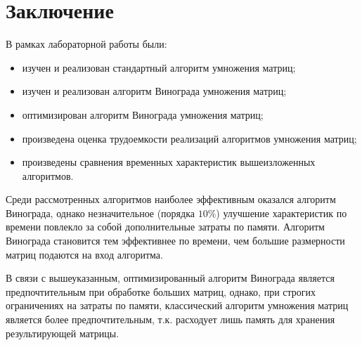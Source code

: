 \chapter*{Заключение}

В рамках лабораторной работы были:
\begin{itemize}
	\item изучен и реализован стандартный алгоритм умножения матриц;
	\item изучен и реализован алгоритм Винограда умножения матриц;
	\item оптимизирован алгоритм Винограда умножения матриц;
	\item произведена оценка трудоемкости реализаций алгоритмов умножения матриц;
	\item произведены сравнения временных характеристик вышеизложенных алгоритмов.
\end{itemize}
 
Среди рассмотренных алгоритмов наиболее эффективным оказался алгоритм Винограда, однако незначительное (порядка $ 10\% $) улучшение характеристик по времени повлекло за собой дополнительные затраты по памяти.
Алгоритм Винограда становится тем эффективнее по времени, чем большие размерности матриц подаются на вход алгоритма.

В связи с вышеуказанным, оптимизированный алгоритм Винограда является предпочтительным при обработке больших матриц, однако, при строгих ограничениях на затраты по памяти, классический алгоритм умножения матриц является более предпочтительным, т.к. расходует лишь память для хранения результирующей матрицы.